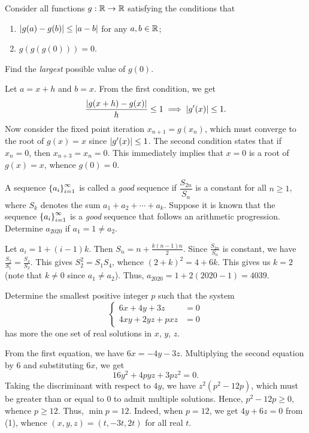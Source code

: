\begin{question}[0]\label{Q::2020-O-1-14}
    Consider all functions $g : \mathbb{R} \to \mathbb{R}$ satisfying the conditions that
    \begin{enumerate}
    \item $\left\lvert g(a) - g(b) \right\rvert \leq \left\lvert a - b \right\rvert$ for any $a, b \in \mathbb{R}$;
    \item $g(g(g(0))) = 0$.
    \end{enumerate}
    Find the \textit{largest} possible value of $g(0)$.
\end{question}
\begin{solution*}
    Let $a = x+h$ and $b = x$. From the first condition, we get \[\frac{\left\lvert g(x+h) - g(x) \right\rvert}{h} \leq 1 \implies \left\lvert g'(x) \right\rvert \leq 1.\] Now consider the fixed point iteration $x_{n+1} = g(x_n)$, which must converge to the root of $g(x) = x$ since $\left\lvert g'(x) \right\rvert \leq 1$. The second condition states that if $x_n = 0$, then $x_{n+3} = x_n = 0$. This immediately implies that $x = 0$ is a root of $g(x) = x$, whence $g(0) = 0$.
\end{solution*}

\begin{question}[4039]\label{Q::2020-O-1-15}
    A sequence $\left\lbrace a_i \right\rbrace_{i=1}^\infty$ is called a \textit{good} sequence if $\dfrac{S_{2n}}{S_n}$ is a constant for all $n \geq 1$, where $S_k$ denotes the sum $a_1 + a_2 + \cdots + a_k$. Suppose it is known that the sequence $\left\lbrace a_i \right\rbrace_{i = 1}^\infty$ is a \textit{good} sequence that follows an arithmetic progression. Determine $a_{2020}$ if $a_1 = 1 \neq a_2$.
\end{question}
\begin{solution*}
    Let $a_i = 1 + (i-1)k$. Then $S_n = n + \frac{k(n-1)n}{2}$. Since $\frac{S_{2n}}{S_n}$ is constant, we have $\frac{S_2}{S_1} = \frac{S_4}{S_2}$. This gives $S_2^2 = S_1 S_4$, whence $(2+k)^2 = 4 + 6k$. This gives us $k = 2$ (note that $k \neq 0$ since $a_1 \neq a_2$). Thus, $a_{2020} = 1 + 2(2020-1) = 4039$.
\end{solution*}

\clearpage
\begin{question}[12]\label{Q::2020-O-1-16}
    Determine the smallest positive integer $p$ such that the system \[\left\{
    \begin{aligned}
        6x + 4y + 3z &= 0\\
        4xy + 2yz + pxz &= 0
    \end{aligned}\right.\] has more the one set of real solutions in $x$, $y$, $z$.
\end{question}
\begin{solution*}
    From the first equation, we have $6x = -4y - 3z$. Multiplying the second equation by 6 and substituting $6x$, we get \[16y^2 + 4pyz + 3pz^2 = 0. \tag{1}\] Taking the discriminant with respect to $4y$, we have $z^2(p^2 - 12p)$, which must be greater than or equal to 0 to admit multiple solutions. Hence, $p^2 - 12p \geq 0$, whence $p \geq 12$. Thus, $\min p = 12$. Indeed, when $p = 12$, we get $4y + 6z = 0$ from (1), whence $(x, y, z) = (t, -3t, 2t)$ for all real $t$.
\end{solution*}

